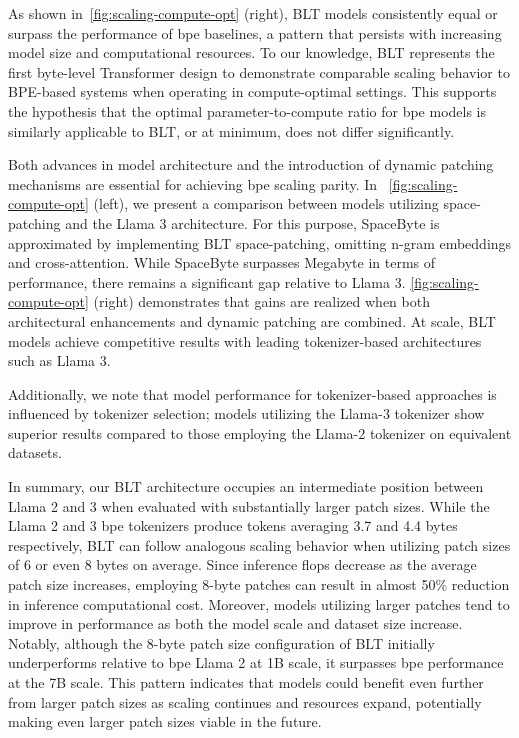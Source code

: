 As shown in~\autoref{fig:scaling-compute-opt} (right), {\textsc BLT} models consistently equal or surpass the performance of bpe baselines, a pattern that persists with increasing model size and computational resources. To our knowledge, {\textsc BLT} represents the first byte-level Transformer design to demonstrate comparable scaling behavior to BPE-based systems when operating in compute-optimal settings. This supports the hypothesis that the optimal parameter-to-compute ratio for bpe models is similarly applicable to {\textsc BLT}, or at minimum, does not differ significantly.

Both advances in model architecture and the introduction of dynamic patching mechanisms are essential for achieving bpe scaling parity. In ~\autoref{fig:scaling-compute-opt} (left), we present a comparison between models utilizing space-patching and the Llama 3 architecture. For this purpose, SpaceByte \citep{slagle2024spacebyte} is approximated by implementing {\textsc BLT} space-patching, omitting n-gram embeddings and cross-attention. While SpaceByte surpasses Megabyte in terms of performance, there remains a significant gap relative to Llama 3. \autoref{fig:scaling-compute-opt} (right) demonstrates that gains are realized when both architectural enhancements and dynamic patching are combined. At scale, {\textsc BLT} models achieve competitive results with leading tokenizer-based architectures such as Llama 3.

Additionally, we note that model performance for tokenizer-based approaches is influenced by tokenizer selection; models utilizing the Llama-3 tokenizer show superior results compared to those employing the Llama-2 tokenizer on equivalent datasets.

In summary, our {\textsc BLT} architecture occupies an intermediate position between Llama 2 and 3 when evaluated with substantially larger patch sizes. While the Llama 2 and 3 bpe tokenizers produce tokens averaging 3.7 and 4.4 bytes respectively, {\textsc BLT} can follow analogous scaling behavior when utilizing patch sizes of 6 or even 8 bytes on average. Since inference flops decrease as the average patch size increases, employing 8-byte patches can result in almost 50\% reduction in inference computational cost. Moreover, models utilizing larger patches tend to improve in performance as both the model scale and dataset size increase. Notably, although the 8-byte patch size configuration of {\textsc BLT} initially underperforms relative to bpe Llama 2 at 1B scale, it surpasses bpe performance at the 7B scale. This pattern indicates that models could benefit even further from larger patch sizes as scaling continues and resources expand, potentially making even larger patch sizes viable in the future.

